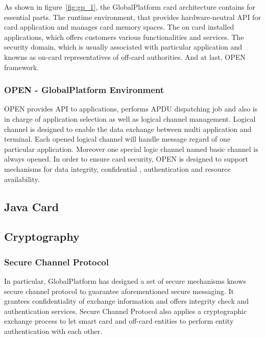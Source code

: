\documentclass[]{llncs}
\begin{document}
As shown in figure~\ref{fig:gp_1},  the GlobalPlatform card architecture contains for essential parts. The runtime environment, that provides hardware-neutral API for card application  and manages card memory spaces. The on card installed applications, which offers customers various functionalities and services. The security domain, which is usually associated with particular application and knowns as on-card representatives  of off-card  authorities. And at last,  OPEN framework\cite{gp}.

\subsubsection{OPEN - GlobalPlatform Environment}
OPEN provides API  to applications, performs APDU dispatching  job and also is in charge of application selection as  well as logical channel management\cite{gp}. Logical channel is designed to enable the data exchange between multi application and terminal. Each opened logical channel will handle message regard of one particular application.  Moreover one special logic channel named basic channel is always opened. In order to ensure  card security, OPEN is designed to support mechanisms for data integrity, confidential ,  authentication and resource availability.
\subsection{Java Card}
\subsection{Cryptography}
\subsubsection{Secure Channel Protocol}
In particular, GlobalPlatform has designed a set of secure mechanisms knows secure channel  protocol to guarantee aforementioned secure messaging. It grantees confidentiality of exchange information and offers integrity check and authentication services. Secure Channel Protocol also applies a cryptographic exchange process to let smart card and  off-card entities to perform entity authentication with each other. 
\end{document}
